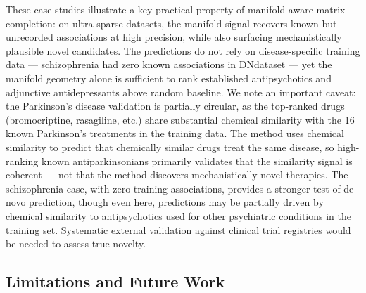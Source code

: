 \documentclass[unnumsec,webpdf,contemporary,large]{oup-authoring-template}
\begin{document}
These case studies illustrate a key practical property of manifold-aware matrix completion: on ultra-sparse datasets, the manifold signal recovers known-but-unrecorded associations at high precision, while also surfacing mechanistically plausible novel candidates. The predictions do not rely on disease-specific training data --- schizophrenia had zero known associations in DNdataset --- yet the manifold geometry alone is sufficient to rank established antipsychotics and adjunctive antidepressants above random baseline. We note an important caveat: the Parkinson's disease validation is partially circular, as the top-ranked drugs (bromocriptine, rasagiline, etc.) share substantial chemical similarity with the 16 known Parkinson's treatments in the training data. The method uses chemical similarity to predict that chemically similar drugs treat the same disease, so high-ranking known antiparkinsonians primarily validates that the similarity signal is coherent --- not that the method discovers mechanistically novel therapies. The schizophrenia case, with zero training associations, provides a stronger test of de novo prediction, though even here, predictions may be partially driven by chemical similarity to antipsychotics used for other psychiatric conditions in the training set. Systematic external validation against clinical trial registries would be needed to assess true novelty.

\subsection{Limitations and Future Work}
\label{sec:limitations}
\end{document}
